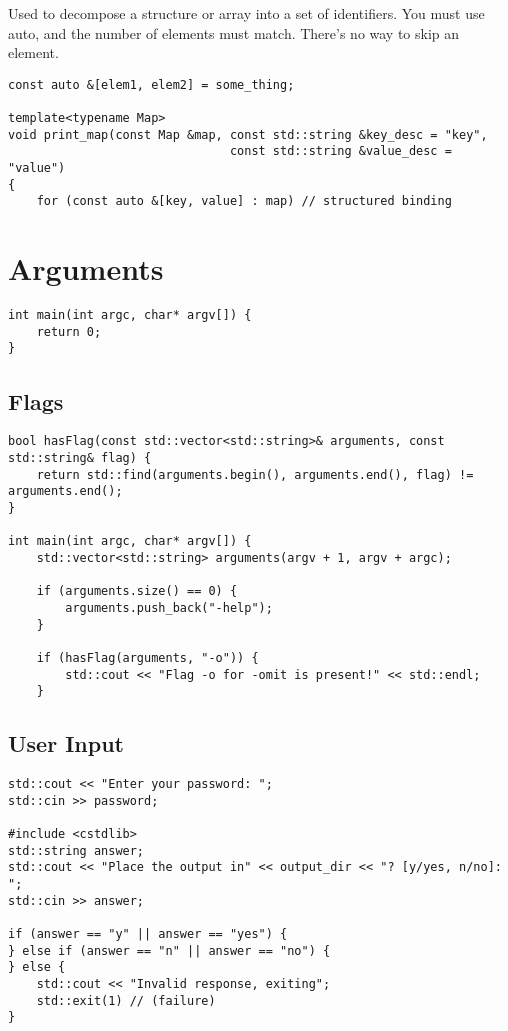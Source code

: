 Used to decompose a structure or array into a set of identifiers.
You must use auto, and the number of elements must match. There's no way to skip an element.

\begin{verbatim}
const auto &[elem1, elem2] = some_thing;

template<typename Map>
void print_map(const Map &map, const std::string &key_desc = "key",
                               const std::string &value_desc = "value")
{
    for (const auto &[key, value] : map) // structured binding
\end{verbatim}

\section{Arguments}

\begin{verbatim}
int main(int argc, char* argv[]) {
    return 0;
}
\end{verbatim}

\subsection{Flags}

\begin{verbatim}
bool hasFlag(const std::vector<std::string>& arguments, const std::string& flag) {
    return std::find(arguments.begin(), arguments.end(), flag) != arguments.end();
}

int main(int argc, char* argv[]) {
    std::vector<std::string> arguments(argv + 1, argv + argc);

    if (arguments.size() == 0) {
        arguments.push_back("-help");
    }

    if (hasFlag(arguments, "-o")) {
        std::cout << "Flag -o for -omit is present!" << std::endl;
    }
\end{verbatim}

\subsection{User Input}

\begin{verbatim}
std::cout << "Enter your password: ";
std::cin >> password;

#include <cstdlib>
std::string answer;
std::cout << "Place the output in" << output_dir << "? [y/yes, n/no]: ";
std::cin >> answer;

if (answer == "y" || answer == "yes") {
} else if (answer == "n" || answer == "no") {
} else {
    std::cout << "Invalid response, exiting";
    std::exit(1) // (failure)
}
\end{verbatim}


